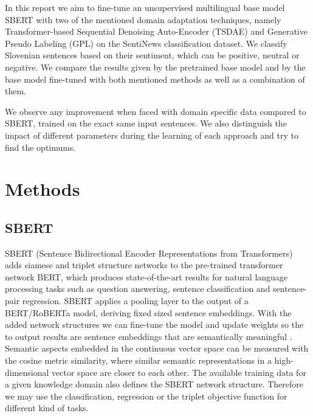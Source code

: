 \documentclass[fleqn,moreauthors,10pt]{ds_report}
\begin{document}
In this report we aim to fine-tune an unsupervised multilingual base model SBERT with two of the mentioned domain adaptation techniques, namely Transformer-based Sequential Denoising Auto-Encoder (TSDAE) and Generative Pseudo Labeling (GPL) on the SentiNews classification dataset. We classify Slovenian sentences based on their sentiment, which can be positive, neutral or negative. We compare the results given by the pretrained base model and by the base model fine-tuned with both mentioned methods as well as a combination of them. 

We observe any improvement when faced with domain specific data compared to SBERT, trained on the exact same input sentences. We also distinguish the impact of different parameters during the learning of each approach and try to find the optimums.






\section*{Methods}

\subsection*{SBERT}
SBERT (Sentence Bidirectional Encoder Representations from Transformers) adds siamese and triplet structure networks to the pre-trained transformer network BERT, which produces state-of-the-art results for natural language processing tasks such as question answering, sentence classification and sentence-pair regression. SBERT applies a pooling layer to the output of a BERT/RoBERTa model, deriving fixed sized sentence embeddings. With the added network structures we can fine-tune the model and update weights so the to output results are sentence embeddings that are semantically meaningful \cite{SBERT}. Semantic aspects embedded in the continuous vector space can be measured with the cosine metric similarity, where similar semantic representations in a high-dimensional vector space are closer to each other. The available training data for a given knowledge domain also defines the SBERT network structure. Therefore we may use the classification, regression or the triplet objective function for different kind of tasks.
\end{document}
